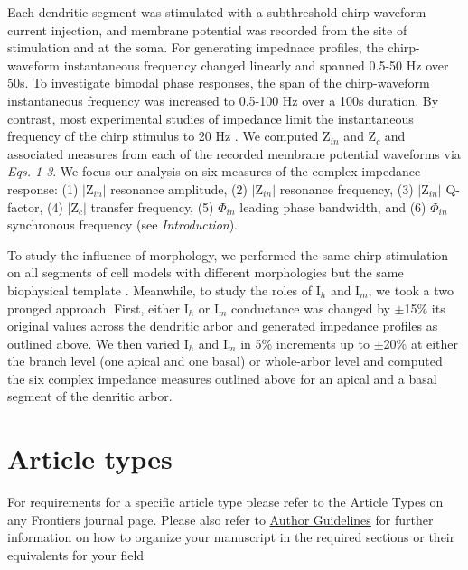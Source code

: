 \documentclass[utf8]{frontiersSCNS} %
\begin{document}
Each dendritic segment was stimulated with a subthreshold chirp-waveform current injection, and membrane potential
was recorded from the site of stimulation and at the soma. For generating impednace profiles, the chirp-waveform 
instantaneous frequency changed linearly and spanned 0.5-50 Hz over 50s. To investigate bimodal phase responses, the
span of the chirp-waveform instantaneous frequency was increased to 0.5-100 Hz over a 100s duration.  By contrast,
most experimental studies of impedance limit the instantaneous frequency of the chirp stimulus to 20 Hz 
\citep{Ulrich2002-dd, Dembrow2015-zb}.  We computed Z$_{in}$ and Z$_c$ and associated measures from each of the 
recorded membrane potential waveforms via \emph{Eqs. 1-3}.  We focus our analysis on six measures of the complex 
impedance response: (1) $|$Z$_{in}|$ resonance amplitude, (2) $|$Z$_{in}|$ resonance frequency,
(3) $|$Z$_{in}|$ Q-factor, (4) $|$Z$_{c}|$ transfer frequency, (5) $\Phi_{in}$ leading phase bandwidth, 
and (6) $\Phi_{in}$ synchronous frequency (see \emph{Introduction}).

To study the influence of morphology, we performed the same chirp stimulation on all segments of cell models with
different morphologies but the same biophysical template \citep{Hay2011-if}.  Meanwhile, to study the roles of I$_h$ 
and I$_m$, we took a two pronged approach.  First, either I$_h$ or I$_m$ conductance was changed by $\pm$15\% its original
values across the dendritic arbor and generated impedance profiles as outlined above.  We then varied I$_h$ and I$_m$ in 5\%
increments up to $\pm$20\% at either the branch level (one apical and one basal) or whole-arbor level and computed the six 
complex impedance measures outlined above for an apical and a basal segment of the denritic arbor.

\section{Article types}

For requirements for a specific article type please refer to the Article Types on any Frontiers journal page. Please also refer to  \href{http://home.frontiersin.org/about/author-guidelines#Sections}{Author Guidelines} for further information on how to organize your manuscript in the required sections or their equivalents for your field

\end{document}

